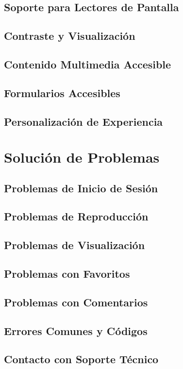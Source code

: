 \documentclass[11pt,a4paper,twoside]{book}
\begin{document}
\section{Soporte para Lectores de Pantalla}
\section{Contraste y Visualización}
\section{Contenido Multimedia Accesible}
\section{Formularios Accesibles}
\section{Personalización de Experiencia}

\chapter{Solución de Problemas}
\section{Problemas de Inicio de Sesión}
\section{Problemas de Reproducción}
\section{Problemas de Visualización}
\section{Problemas con Favoritos}
\section{Problemas con Comentarios}
\section{Errores Comunes y Códigos}
\section{Contacto con Soporte Técnico}
\end{document}
